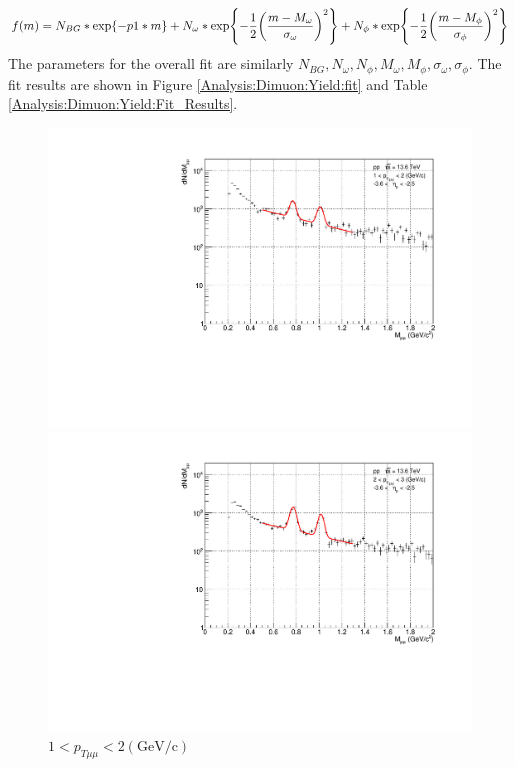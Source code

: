                 \begin{eqnarray}
                    \label{fit:globalfit}
                    f(m)=N_{BG}*\exp{-p1* m}+N_{\omega}*\exp{-\frac{1}{2}\qty(\frac{m-M_{\omega}}{\sigma_{\omega}})^2}+N_{\phi}*\exp{-\frac{1}{2}\qty(\frac{m-M_{\phi}}{\sigma_{\phi}})^2}
                \end{eqnarray}
                The parameters for the overall fit are similarly \(N_{BG}, N_{\omega}, N_{\phi}, M_{\omega}, M_{\phi}, \sigma_{\omega}, \sigma_{\phi}\). The fit results are shown in Figure \ref{Analysis:Dimuon:Yield:fit} and Table \ref{Analysis:Dimuon:Yield:Fit_Results}.
                \begin{figure}[H]
                    \centering
                    \begin{minipage}{0.45\textwidth}
                        \centering
                        \includegraphics[width=\textwidth]{fig/3_4_2_fit_pt_1to2.pdf}
                        \captionsetup{labelformat=empty}
                        \caption*{$1 < p_{T\mu\mu} < 2 (\mathrm{GeV/c})$}
                    \end{minipage}
                    \hfill
                    \begin{minipage}{0.45\textwidth}
                        \centering
                        \includegraphics[width=\textwidth]{fig/3_4_2_fit_pt_2to3.pdf}

\end{minipage}
\end{figure}
